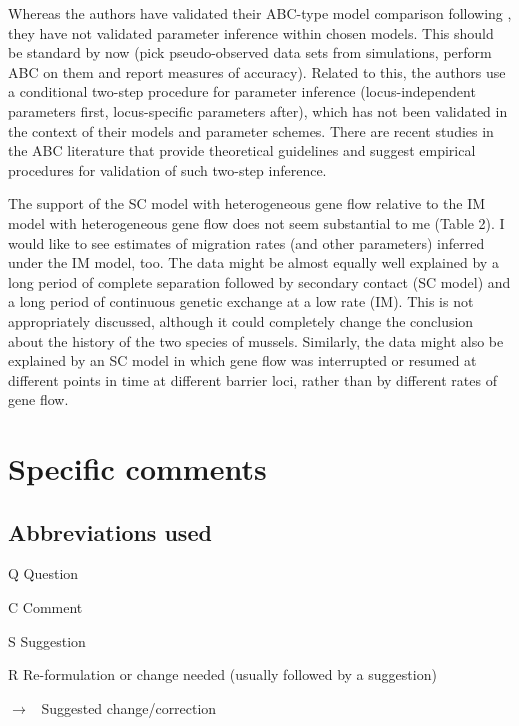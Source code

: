 \documentclass[11pt]{article}
\newenvironment{my_description}
{\begin{description}
  \setlength{\itemsep}{2pt}
  \setlength{\parskip}{0pt}
  \setlength{\parsep}{0pt}}
{\end{description}}
\newenvironment{my_enumerate}
{\begin{enumerate}
  \setlength{\itemsep}{2pt}
  \setlength{\parskip}{0pt}
  \setlength{\parsep}{0pt}}
{\end{enumerate}}
\newcommand{\ra}{$\rightarrow$\ }
\begin{document}
\begin{my_enumerate}
	\item Whereas the authors have validated their ABC-type model comparison following \cite{Fagundes:2007rc}, they have not validated parameter inference within chosen models. This should be standard by now (pick pseudo-observed data sets from simulations, perform ABC on them and report measures of accuracy). Related to this, the authors use a conditional two-step procedure for parameter inference (locus-independent parameters first, locus-specific parameters after), which has not been validated in the context of their models and parameter schemes. There are recent studies in the ABC literature that provide theoretical guidelines and suggest empirical procedures for validation of such two-step inference.
	\item The support of the SC model with heterogeneous gene flow relative to the IM model with heterogeneous gene flow does not seem substantial to me (Table 2). I would like to see estimates of migration rates (and other parameters) inferred under the IM model, too. The data might be almost equally well explained by a long period of complete separation followed by secondary contact (SC model) and a long period of continuous genetic exchange at a low rate (IM). This is not appropriately discussed, although it could completely change the conclusion about the history of the two species of mussels. Similarly, the data might also be explained by an SC model in which gene flow was interrupted or resumed at different points in time at different barrier loci, rather than by different rates of gene flow.
\end{my_enumerate}
	

\section{Specific comments}

\subsection{Abbreviations used}
\begin{my_description}
	\item[Q] Question
	\item[C] Comment
	\item[S] Suggestion
	\item[R] Re-formulation or change needed (usually followed by a suggestion)
	\item[\ra] Suggested change/correction
\end{my_description}
\end{document}
